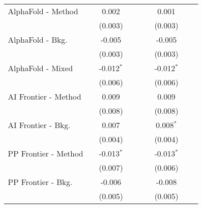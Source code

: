 \begin{tabular}{lcccccccc}
   AlphaFold - Method                             &               & 0.002        &       &       &               & 0.001        &       &   \\   
                                                  &               & (0.003)      &       &       &               & (0.003)      &       &   \\   
   AlphaFold - Bkg.                               &               & -0.005       &       &       &               & -0.005       &       &   \\   
                                                  &               & (0.003)      &       &       &               & (0.003)      &       &   \\   
   AlphaFold - Mixed                              &               & -0.012$^{*}$ &       &       &               & -0.012$^{*}$ &       &   \\   
                                                  &               & (0.006)      &       &       &               & (0.006)      &       &   \\   
   AI Frontier - Method                           &               & 0.009        &       &       &               & 0.009        &       &   \\   
                                                  &               & (0.008)      &       &       &               & (0.008)      &       &   \\   
   AI Frontier - Bkg.                             &               & 0.007        &       &       &               & 0.008$^{*}$  &       &   \\   
                                                  &               & (0.004)      &       &       &               & (0.004)      &       &   \\   
   PP Frontier - Method                           &               & -0.013$^{*}$ &       &       &               & -0.013$^{*}$ &       &   \\   
                                                  &               & (0.007)      &       &       &               & (0.006)      &       &   \\   
   PP Frontier - Bkg.                             &               & -0.006       &       &       &               & -0.008       &       &   \\   
                                                  &               & (0.005)      &       &       &               & (0.005)      &       &   \\   

\end{tabular}
